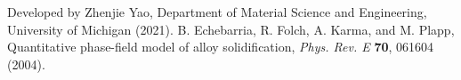 \documentclass[10pt]{article}
\begin{document}
\begin{thebibliography}{plain}
    Developed by Zhenjie Yao, Department of Material Science and Engineering, University of Michigan (2021).
     B. Echebarria, R. Folch, A. Karma, and M. Plapp, Quantitative phase-field model of alloy solidification, \emph{Phys. Rev. E} {\bf 70}, 061604 (2004).
\end{thebibliography}
\end{document}
